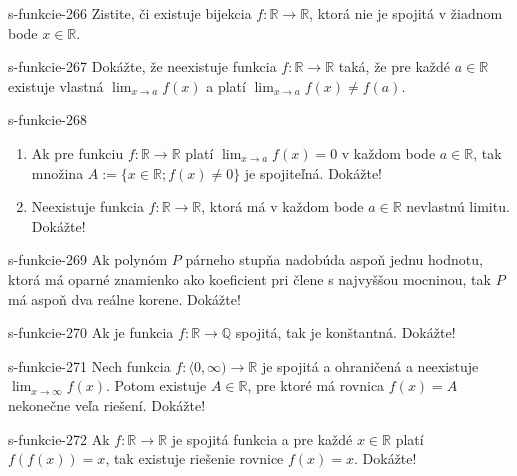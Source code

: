\begin{defproblem}{s-funkcie-266}
Zistite, či existuje bijekcia $f: \mathbb{R} \rightarrow \mathbb{R}$, ktorá nie je spojitá v žiadnom bode $x \in \mathbb{R}$.
\end{defproblem}

\begin{defproblem}{s-funkcie-267}
Dokážte, že neexistuje funkcia $f: \mathbb{R} \rightarrow \mathbb{R}$ taká, že pre každé $a \in \mathbb{R}$ existuje vlastná $\lim_{x \rightarrow a}f(x)$ a platí $\lim_{x \rightarrow a}f(x) \neq f(a)$.
\end{defproblem}

\begin{defproblem}{s-funkcie-268}
\begin{enumerate}
\item Ak pre funkciu $f: \mathbb{R} \rightarrow \mathbb{R}$ platí $\lim_{x \rightarrow a}f(x)=0$ v každom bode $a \in \mathbb{R}$, tak množina $A:=\{x \in \mathbb{R};f(x)\neq 0\}$ je spojiteľná. Dokážte!
\item Neexistuje funkcia $f: \mathbb{R} \rightarrow \mathbb{R}$, ktorá má v každom bode $a \in \mathbb{R}$ nevlastnú limitu. Dokážte!
\end{enumerate}
\end{defproblem}

\begin{defproblem}{s-funkcie-269}
Ak polynóm $P$ párneho stupňa nadobúda aspoň jednu hodnotu, ktorá má oparné znamienko ako koeficient pri člene s najvyššou mocninou, tak $P$ má aspoň dva reálne korene. Dokážte!
\end{defproblem}

\begin{defproblem}{s-funkcie-270}
Ak je funkcia $f: \mathbb{R} \rightarrow \mathbb{Q}$ spojitá, tak je konštantná. Dokážte!
\end{defproblem}

\begin{defproblem}{s-funkcie-271}
Nech funkcia $f: \langle 0, \infty) \rightarrow \mathbb{R}$ je spojitá a ohraničená a neexistuje $\lim_{x \rightarrow \infty}f(x)$. Potom existuje $A \in \mathbb{R}$, pre ktoré má rovnica $f(x)=A$ nekonečne veľa riešení. Dokážte!
\end{defproblem}

\begin{defproblem}{s-funkcie-272}
Ak $f: \mathbb{R} \rightarrow \mathbb{R}$ je spojitá funkcia a pre každé $x \in \mathbb{R}$ platí $f(f(x))=x$, tak existuje riešenie rovnice $f(x)=x$. Dokážte!
\end{defproblem}

